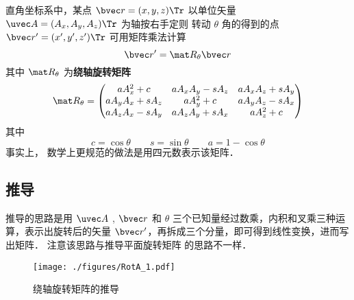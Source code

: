 

直角坐标系中，某点 $\bvec r=(x,y,z)\Tr$ 以单位矢量 $\uvec A=(A_x, A_y, A_z)\Tr$ 为轴按右手定则%
转动 $\theta$ 角的得到的点 $\bvec r'=(x',y',z')\Tr$ 可用矩阵乘法计算
\begin{equation}
\bvec r' = \mat R_\theta \bvec r
\end{equation}
其中 $\mat R_\theta$ 为\textbf{绕轴旋转矩阵}
\begin{equation}
\mat R_\theta =
\begin{pmatrix}
a A_x^2 + c & a A_x A_y - s A_z & a A_x A_z + s A_y\\
a A_y A_x + s A_z & a A_y^2 + c & a A_y A_z - s A_x\\
a A_z A_x - s A_y & a A_z A_y + s A_x & a A_z^2 + c
\end{pmatrix}\end{equation}
其中
\begin{equation}
c = \cos\theta \qquad s = \sin\theta \qquad a = 1 - \cos\theta
\end{equation}
事实上， 数学上更规范的做法是用四元数表示该矩阵．

\subsection{推导}
推导的思路是用 $\uvec A$ , $\bvec r$ 和 $\theta $ 三个已知量经过数乘，内积和叉乘三种运算，表示出旋转后的矢量 $\bvec r'$，再拆成三个分量，即可得到线性变换，进而写出矩阵． 注意该思路与推导平面旋转矩阵 的思路不一样．
\begin{figure}[ht]
\centering
\texttt{[image: ./figures/RotA\_1.pdf]}
\caption{绕轴旋转矩阵的推导}
\end{figure} 

